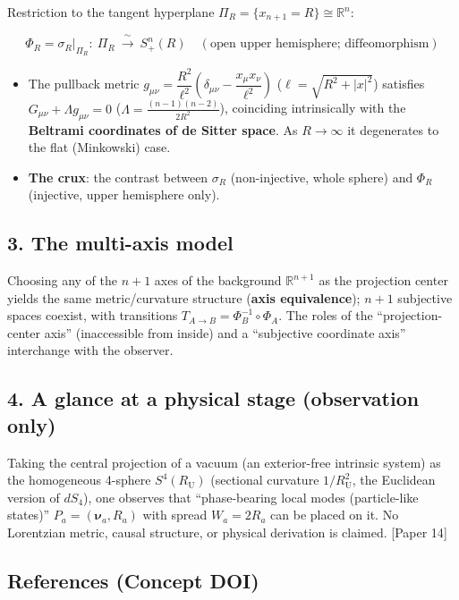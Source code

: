 \documentclass[
  10pt,
]{article}
\providecommand{\tightlist}{%
  \setlength{\itemsep}{0pt}\setlength{\parskip}{0pt}}
\begin{document}
Restriction to the tangent hyperplane
\(\Pi_R=\{x_{n+1}=R\}\cong\mathbb{R}^n\):

\[\Phi_R=\sigma_R\big|_{\Pi_R}:\ \Pi_R\ \xrightarrow{\ \sim\ }\ S^n_+(R)\quad(\text{open upper hemisphere; diffeomorphism})\]

\begin{itemize}
\tightlist
\item
  The pullback metric
  \(g_{\mu\nu}=\dfrac{R^2}{\ell^2}\!\left(\delta_{\mu\nu}-\dfrac{x_\mu x_\nu}{\ell^2}\right)\)
  (\(\ell=\sqrt{R^2+|x|^2}\)) satisfies
  \(G_{\mu\nu}+\Lambda g_{\mu\nu}=0\)
  (\(\Lambda=\tfrac{(n-1)(n-2)}{2R^2}\)), coinciding intrinsically with
  the \textbf{Beltrami coordinates of de Sitter space}. As
  \(R\to\infty\) it degenerates to the flat (Minkowski) case.
\item
  \textbf{The crux}: the contrast between \(\sigma_R\) (non-injective,
  whole sphere) and \(\Phi_R\) (injective, upper hemisphere only).
\end{itemize}

\subsection{3. The multi-axis model}\label{the-multi-axis-model}

Choosing any of the \(n+1\) axes of the background \(\mathbb{R}^{n+1}\)
as the projection center yields the same metric/curvature structure
(\textbf{axis equivalence}); \(n+1\) subjective spaces coexist, with
transitions \(T_{A\to B}=\Phi_B^{-1}\circ\Phi_A\). The roles of the
``projection-center axis'' (inaccessible from inside) and a ``subjective
coordinate axis'' interchange with the observer.

\subsection{4. A glance at a physical stage (observation
only)}\label{a-glance-at-a-physical-stage-observation-only}

Taking the central projection of a vacuum (an exterior-free intrinsic
system) as the homogeneous 4-sphere \(S^4(R_{\mathrm U})\) (sectional
curvature \(1/R_{\mathrm U}^2\), the Euclidean version of \(dS_4\)), one
observes that ``phase-bearing local modes (particle-like states)''
\(P_a=(\boldsymbol{\nu}_a,R_a)\) with spread \(W_a=2R_a\) can be placed
on it. No Lorentzian metric, causal structure, or physical derivation is
claimed. {[}Paper 14{]}

\subsection{References (Concept DOI)}\label{references-concept-doi}
\end{document}
